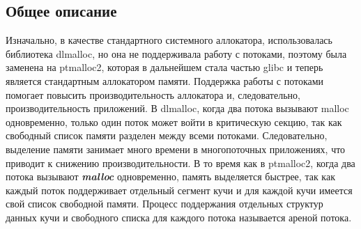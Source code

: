 \subsection{Общее описание}
Изначально, в качестве стандартного системного аллокатора, использовалась библиотека dlmalloc, но она не поддерживала работу с потоками, поэтому была заменена на ptmalloc2, которая в дальнейшем стала частью glibc и теперь является стандартным аллокатором памяти. Поддержка работы с потоками помогает повысить производительность аллокатора и, следовательно, производительность приложений. В dlmalloc, когда два потока вызывают malloc одновременно, только один поток может войти в критическую секцию, так как свободный список памяти разделен между всеми потоками. Следовательно, выделение памяти занимает много времени в многопоточных приложениях, что приводит к снижению производительности. В то время как в ptmalloc2, когда два потока вызывают \textbf{\textit{malloc}} одновременно, память выделяется быстрее, так как каждый поток поддерживает отдельный сегмент кучи и для каждой кучи имеется свой список свободной памяти. Процесс поддержания отдельных структур данных кучи и свободного списка для каждого потока называется ареной потока.\cite{glibc-malloc-overview}

